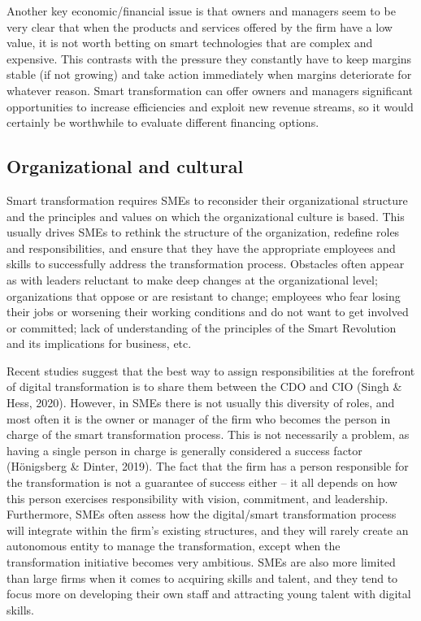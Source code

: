 \documentclass[
  letterpaper,
  DIV=11,
  numbers=noendperiod]{scrreprt}
\begin{document}
Another key economic/financial issue is that owners and managers seem to
be very clear that when the products and services offered by the firm
have a low value, it is not worth betting on smart technologies that are
complex and expensive. This contrasts with the pressure they constantly
have to keep margins stable (if not growing) and take action immediately
when margins deteriorate for whatever reason. Smart transformation can
offer owners and managers significant opportunities to increase
efficiencies and exploit new revenue streams, so it would certainly be
worthwhile to evaluate different financing options.

\hypertarget{organizational-and-cultural}{%
\subsection{Organizational and
cultural}\label{organizational-and-cultural}}

Smart transformation requires SMEs to reconsider their organizational
structure and the principles and values on which the organizational
culture is based. This usually drives SMEs to rethink the structure of
the organization, redefine roles and responsibilities, and ensure that
they have the appropriate employees and skills to successfully address
the transformation process. Obstacles often appear as with leaders
reluctant to make deep changes at the organizational level;
organizations that oppose or are resistant to change; employees who fear
losing their jobs or worsening their working conditions and do not want
to get involved or committed; lack of understanding of the principles of
the Smart Revolution and its implications for business, etc.

Recent studies suggest that the best way to assign responsibilities at
the forefront of digital transformation is to share them between the CDO
and CIO (Singh \& Hess, 2020). However, in SMEs there is not usually
this diversity of roles, and most often it is the owner or manager of
the firm who becomes the person in charge of the smart transformation
process. This is not necessarily a problem, as having a single person in
charge is generally considered a success factor (Hönigsberg \& Dinter,
2019). The fact that the firm has a person responsible for the
transformation is not a guarantee of success either -- it all depends on
how this person exercises responsibility with vision, commitment, and
leadership. Furthermore, SMEs often assess how the digital/smart
transformation process will integrate within the firm's existing
structures, and they will rarely create an autonomous entity to manage
the transformation, except when the transformation initiative becomes
very ambitious. SMEs are also more limited than large firms when it
comes to acquiring skills and talent, and they tend to focus more on
developing their own staff and attracting young talent with digital
skills.
\end{document}
